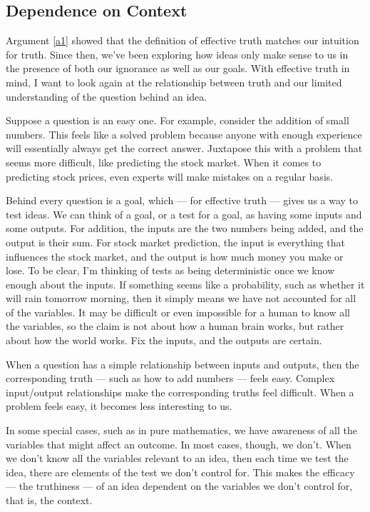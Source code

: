 \documentclass[11pt, oneside]{article}   	%
\begin{document}

\subsection{Dependence on Context}

Argument \ref{a1} showed that 
the definition of effective truth matches our
intuition for truth.
Since then,
we've been exploring how ideas only make sense to us in the
presence of both our ignorance as well as our goals.
With effective truth in mind, I want to look again at
the relationship between truth and our limited understanding of the
question behind an idea.

Suppose a question is an easy one. For example, consider the addition of small
numbers. This feels like a solved problem because anyone with enough experience
will essentially always get the correct answer.
Juxtapose this with a problem that seems more difficult, like predicting the
stock market. When it comes to predicting stock prices, even experts will make
mistakes on a regular basis.

Behind every question is a goal, which --- for effective truth --- gives
us a way to test ideas.
We can think of a goal, or a test for a goal, as having some inputs
and some outputs. For addition, the inputs are the two numbers being added, and
the output is their sum. For stock market prediction, the input is everything
that influences the stock market,
and the output is how much
money you make or lose.
To be clear, I'm thinking of tests as being deterministic once we know enough
about the inputs. If something seems like a probability, such as whether it will
rain tomorrow morning, then it simply means we have not accounted for all
of the variables. It may be difficult or even impossible for a human to know all
the variables, so the claim is not about how a human brain works, but rather
about how the world works. Fix the inputs, and the outputs are certain.

When a question has a simple relationship between inputs and outputs, then the
corresponding truth --- such as how to add numbers --- feels easy. Complex
input/output relationships make the corresponding truths feel difficult.
When a problem feels easy, it becomes less interesting to us.

In some special cases, such as in pure mathematics,
we have awareness of all the variables that might affect an outcome.
In most cases, though, we don't.
When we don't know all the variables relevant to an idea, then each time we
test the idea, there are elements of the test we don't control for.
This makes the efficacy --- the truthiness --- of an idea dependent on the
variables we don't control for, that is, the context.
\end{document}
